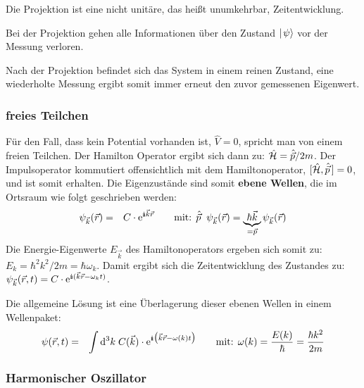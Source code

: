 \begin{itemize1}
	\item Die Projektion ist eine nicht unitäre, das heißt unumkehrbar, Zeitentwicklung. 
	\item Bei der Projektion gehen alle Informationen über den Zustand $\mid\!\!\!\,\,{\psi}\rangle$ vor der Messung verloren.
	\item Nach der Projektion befindet sich das System in einem reinen Zustand, eine wiederholte Messung ergibt somit immer erneut den zuvor gemessenen Eigenwert.
\end{itemize1}


\subsubsection{freies Teilchen}

Für den Fall, dass kein Potential vorhanden ist, $\hat{V}=0$, spricht man von einem freien Teilchen. Der Hamilton Operator ergibt sich dann zu: $\hat{\mathcal H}=\hat{\vec{p}}/2m$. Der Impulsoperator kommutiert offensichtlich mit dem Hamiltonoperator, $[\hat{\mathcal H},\hat{\vec{p}}\,]=0$, und ist somit erhalten. Die Eigenzustände sind somit {\bf ebene Wellen}, die im Ortsraum wie folgt geschrieben werden: 
\begin{eqnarray*}
	\psi_{\vec k}(\vec{r}) &=& C \cdot \e^{\I \vec{k}\vec{r}} \qquad \text{mit: } \hat{\vec{p}}\;\;\psi_{\vec k}(\vec r) = \underbrace{\hbar\vec{k}}_{=\vec{p}}\psi_{\vec k}(\vec r)
\end{eqnarray*}
Die Energie-Eigenwerte $E_{\vec{k}}$ des Hamiltonoperators ergeben sich somit zu: $E_{k}=\hbar^2k^2/2 m=\hbar\omega_k$. Damit ergibt sich die Zeitentwicklung des Zustandes zu: $\psi_{\vec{k}}(\vec{r},t) = C\cdot\e^{\I(\vec{k}\vec{r}-\omega_kt)}$. 

Die allgemeine Lösung ist eine Überlagerung dieser ebenen Wellen in einem Wellenpaket: 
\begin{eqnarray*}
	\psi(\vec{r},t) &=& \int \mathrm{d}^3k\; C(\vec{k})\cdot\e^{\I\big(\vec{k}\vec{r}-\omega(k)t\big)} \qquad\text{mit: }\omega(k) = \frac{E(k)}{\hbar} = \frac{\hbar k^2}{2m}
\end{eqnarray*}


\subsubsection{Harmonischer Oszillator}

